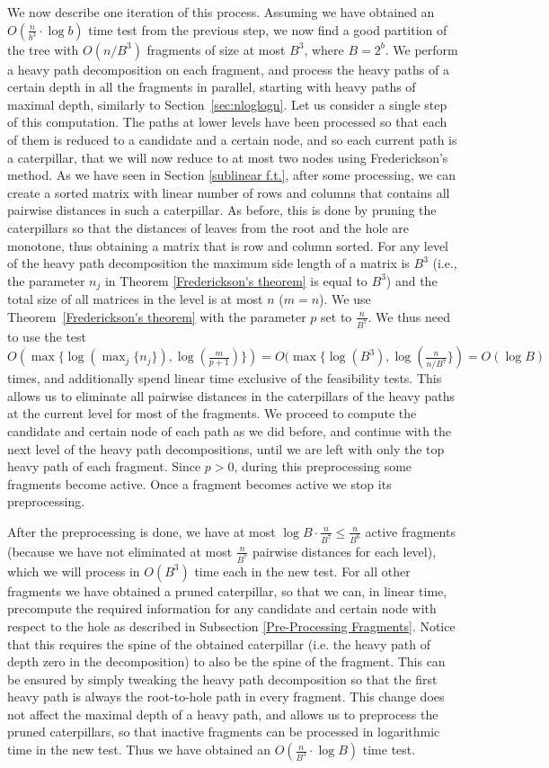 \documentclass[11pt,a4paper]{article}
\theoremstyle{definition}
\theoremstyle{remark}
\begin{document}
We now describe one iteration of this process. Assuming we have obtained an $O(\frac{n}{b^3} \cdot \log b)$ time 
test from the previous step, we now find a good partition of the tree with $O(n/B^{3})$ fragments of size at most $B^3$, 
where $B=2^b$. We perform a heavy path decomposition on each fragment, and process the heavy
paths of a certain depth in all the fragments in parallel, starting with heavy paths of maximal depth, similarly to Section~\ref{sec:nloglogn}. Let us consider a single step of this computation. The paths at lower levels have been processed so that each of them is
reduced to a candidate and a certain node, and so each current path is a caterpillar, that we will now reduce to at most two nodes using Frederickson's method. As we have seen in Section \ref{sublinear f.t.}, after some processing, we can create a sorted matrix 
with linear number of rows and columns that contains all pairwise distances in such a caterpillar. As before, this is done by pruning the caterpillars so that the distances of leaves from the root and the hole are monotone, thus obtaining a matrix that is row and column sorted. For any level of the heavy path decomposition the maximum side length of a matrix is $B^{3}$ (i.e., the parameter $n_j$ in Theorem \ref{Frederickson's theorem} is equal to $B^3$) and the total size of all matrices in the level is at most $n$ ($m=n$).
We use Theorem~\ref{Frederickson's theorem} with the parameter $p$ set to $\frac{n}{B^7}$. We thus need to use the
test $O(\max \lbrace \log(\max_{j} \lbrace n_j \rbrace), \log(\frac{m}{p+1}) \rbrace) = O(\max \lbrace \log (B^{3}), \log(\frac{n}{n/B^{7}} \rbrace) = O(\log B)$ times, and additionally spend linear time exclusive of the feasibility tests. This allows us to eliminate all pairwise distances in the caterpillars of the heavy paths at the current level for most of the fragments. We proceed to compute the candidate and certain node of each path as we did before, and continue with the next level
of the heavy path decompositions, until we are left with only the top heavy path of each fragment.
Since $p>0$, during this preprocessing some fragments become active. Once a fragment becomes active we stop
its preprocessing. 

After the preprocessing is done, we have at most $\log B \cdot \frac{n}{B^7}\leq \frac{n}{B^{6}}$ active fragments (because we have not eliminated at most $\frac{n}{B^7}$ pairwise distances for each level), which we will process in $O(B^{3})$
time each in the new test. For all other fragments we have obtained a pruned caterpillar, so that we can, in linear time, precompute the required information for any candidate and certain node with respect to the hole
as described in Subsection \ref{Pre-Processing Fragments}. Notice that this requires the spine of the obtained caterpillar (i.e. the heavy path of depth zero in the decomposition) to also be the spine of the fragment. This can be ensured by simply tweaking the heavy path decomposition so that the first heavy path is always the root-to-hole path in every fragment. This change does not affect the maximal depth of a heavy path, and allows us to preprocess the pruned caterpillars, so that inactive fragments can be processed in logarithmic time in the new test. Thus we have obtained an $O(\frac{n}{B^3} \cdot \log B)$ time test.
\end{document}
